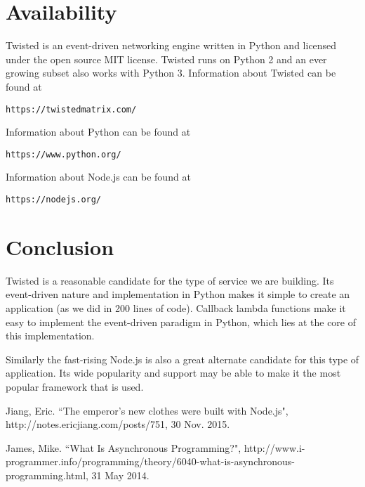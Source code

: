 \documentclass[letterpaper,twocolumn,10pt]{article}
\begin{document}
\section{Availability}

Twisted is an event-driven networking engine written in Python and licensed under the open source ​MIT license. Twisted runs on Python 2 and an ever growing subset also works with Python 3. Information about Twisted can be found at
\begin{center}
{\tt https://twistedmatrix.com/}
\end{center}

\noindent
Information about Python can be found at
\begin{center}
{\tt https://www.python.org/}
\end{center}

\noindent
Information about Node.js can be found at 
\begin{center}
{\tt https://nodejs.org/}
\end{center}

\section{Conclusion}

Twisted is a reasonable candidate for the type of service we are building. Its event-driven nature and implementation in Python makes it simple to create an application (as we did in 200 lines of code). Callback lambda functions make it easy to implement the event-driven paradigm in Python, which lies at the core of this implementation.

Similarly the fast-rising Node.js is also a great alternate candidate for this type of application. Its wide popularity and support may be able to make it the most popular framework that is used.


\begin{thebibliography}{1}

\bibitem{}
Jiang, Eric. ``The emperor’s new clothes were built with Node.js", http://notes.ericjiang.com/posts/751, 30 Nov. 2015.

\bibitem{}
James, Mike. ``What Is Asynchronous Programming?", http://www.i-programmer.info/programming/theory/6040-what-is-asynchronous-programming.html, 31 May 2014.

\end{thebibliography}
\end{document}
